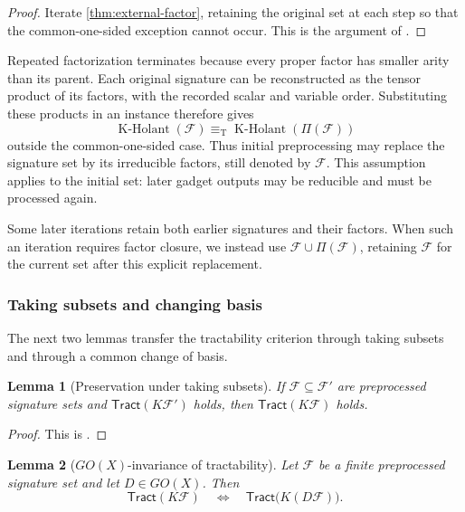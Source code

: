 \documentclass[11pt,letterpaper,onecolumn]{article}
\theoremstyle{plain}
\newtheorem{lemma}[lemma]{Lemma}
\theoremstyle{definition}
\theoremstyle{remark}
\newcommand{\cF}{\mathcal F}
\newcommand{\KHolant}{\operatorname{K\text{-}Holant}}
\newcommand{\Tract}{\mathsf{Tract}}
\newcommand{\equivT}{\equiv_{\mathrm T}}
\begin{document}
	\begin{proof}
		Iterate \cref{thm:external-factor}, retaining the original set at each
		step so that the common-one-sided exception cannot occur.
		This is the argument of \cite[Lemma~2.23]{Liu2026DEQ2Holant}.
	\end{proof}

Repeated factorization terminates because every proper factor has smaller
arity than its parent.  Each original signature can be reconstructed as
the tensor product of its factors, with the recorded scalar and variable
order.  Substituting these products in an instance therefore gives
\[
\KHolant(\cF)\equivT\KHolant(\Pi(\cF))
\]
outside the common-one-sided case.  Thus initial preprocessing may replace
the signature set by its irreducible factors, still denoted by \(\cF\).
This assumption applies to the initial set: later gadget outputs may be
reducible and must be processed again.

Some later iterations retain both earlier signatures and their factors.
When such an iteration requires factor closure, we instead use
\(\cF\cup\Pi(\cF)\), retaining \(\cF\) for the current set after this
explicit replacement.
	
	\subsubsection{Taking subsets and changing basis}

The next two lemmas transfer the tractability criterion through taking
subsets and through a common change of basis.
	
	\begin{lemma}[Preservation under taking subsets]
		\label{lem:downward-inheritance}
		If \(\cF\subseteq\cF'\) are preprocessed signature sets and
		\(\Tract(K\cF')\) holds, then \(\Tract(K\cF)\) holds.
	\end{lemma}
	
	\begin{proof}
		This is \cite[Lemma~2.24]{Liu2026DEQ2Holant}.
	\end{proof}
	
	\begin{lemma}[\(GO(X)\)-invariance of tractability]
		\label{lem:GOX-tract-invariance}
		Let \(\cF\) be a finite preprocessed signature set and let
		\(D\in GO(X)\).  Then
		\begin{equation*}
			\Tract(K\cF)
			\quad\Longleftrightarrow\quad
			\Tract\bigl(K(D\cF)\bigr).
		\end{equation*}
	\end{lemma}
	
\end{document}
